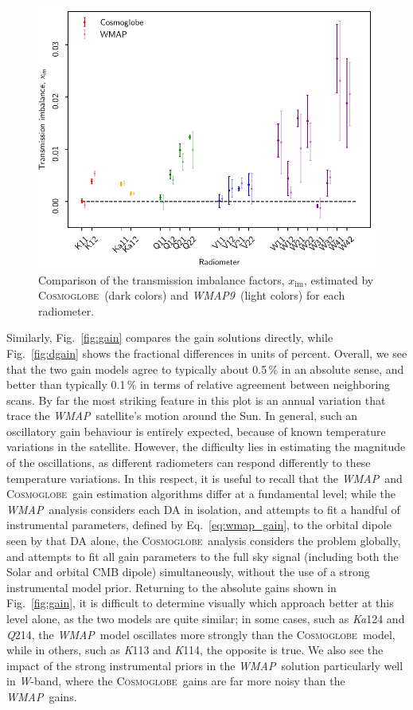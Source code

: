 \documentclass[twocolumn]{../../common/aa}
\def\WMAP{\emph{WMAP}}
\def\WMAPnine{\emph{WMAP9}}
\newcommand{\cosmoglobe}{\textsc{Cosmoglobe}}
\newcommand{\K}[0]{\textit K}
\newcommand{\Ka}[0]{\textit{Ka}}
\newcommand{\Q}[0]{\textit Q}
\newcommand{\W}[0]{\textit W}
\begin{document}
\begin{figure}[t]
	\centering
	\includegraphics[width=\linewidth]{figures/x_im_CG_v1.pdf}
	\caption{Comparison of the transmission imbalance factors, $x_{\mathrm{im}}$, estimated by \cosmoglobe\ (dark colors) and \WMAPnine\ (light colors) for each radiometer.}
	\label{fig:x_im}
\end{figure}

Similarly, Fig.~\ref{fig:gain} compares the gain solutions directly, while Fig.~\ref{fig:dgain} shows the fractional differences in units of percent. Overall, we see that the two gain models agree to typically about 0.5\,\% in an absolute sense, and better than typically 0.1\,\% in terms of relative agreement between neighboring scans. By far the most striking feature in this plot is an annual variation that trace the \WMAP\ satellite's motion around the Sun. In general, such an oscillatory gain behaviour is entirely expected, because of known temperature variations in the satellite. However, the difficulty lies in estimating the magnitude of the oscillations, as different radiometers can respond differently to these temperature variations. In this respect, it is useful to recall that the \WMAP\ and \cosmoglobe\ gain estimation algorithms differ at a fundamental level; while the \WMAP\ analysis considers each DA in isolation, and attempts to fit a handful of instrumental parameters, defined by Eq.~\eqref{eq:wmap_gain}, to the orbital dipole seen by that DA alone, the \cosmoglobe\ analysis considers the problem globally, and attempts to fit all gain parameters to the full sky signal (including both the Solar and orbital CMB dipole) simultaneously, without the use of a strong instrumental model prior. Returning to the absolute gains shown in Fig.~\ref{fig:gain}, it is difficult to determine visually which approach better at this level alone, as the two models are quite similar; in some cases, such as \Ka124 and \Q214, the \WMAP\ model oscillates more strongly than the \cosmoglobe\ model, while in others, such as \K113 and \K114, the opposite is true. We also see the impact of the strong instrumental priors in the \WMAP\ solution particularly well in \W-band, where the \cosmoglobe\ gains are far more noisy than the \WMAP\ gains. 
\end{document}
